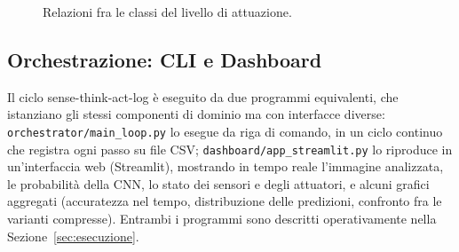 \begin{figure}[h]
\centering
{}
\caption{Relazioni fra le classi del livello di attuazione.}
\label{fig:diagramma-classi}
\end{figure}

\subsection{Orchestrazione: CLI e Dashboard}

Il ciclo sense-think-act-log è eseguito da due programmi equivalenti, che
istanziano gli stessi componenti di dominio ma con interfacce diverse:
\texttt{orchestrator/main\_loop.py} lo esegue da riga di comando, in un
ciclo continuo che registra ogni passo su file CSV; \texttt{dashboard/app\_streamlit.py}
lo riproduce in un'interfaccia web (Streamlit), mostrando in tempo reale
l'immagine analizzata, le probabilità della CNN, lo stato dei sensori e
degli attuatori, e alcuni grafici aggregati (accuratezza nel tempo,
distribuzione delle predizioni, confronto fra le varianti compresse).
Entrambi i programmi sono descritti operativamente nella
Sezione~\ref{sec:esecuzione}.
